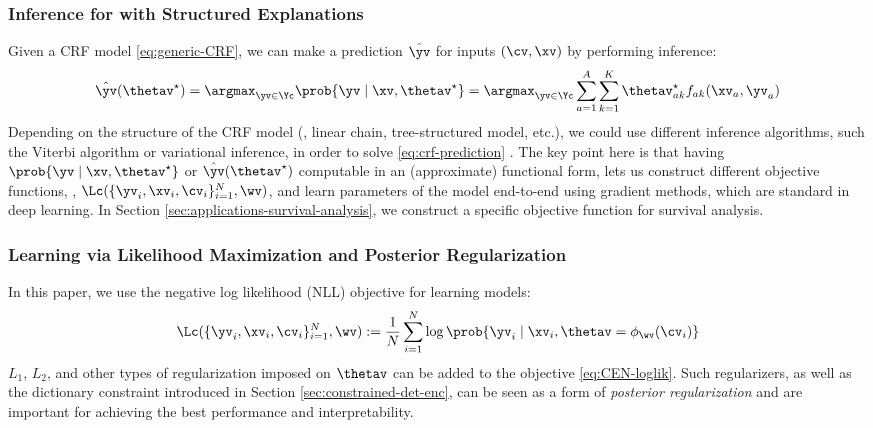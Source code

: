 \documentclass[twoside,11pt]{article}
\begin{document}
\subsubsection{Inference for {\CEN} with Structured Explanations}
\label{sec:inference-CRF}

Given a CRF model \eqref{eq:generic-CRF}, we can make a prediction $\hat\yv$ for inputs $(\cv, \xv)$ by performing inference:
\begin{equation}
    \label{eq:crf-prediction}
    \hat\yv (\thetav^\star) = \argmax_{\yv \in \Yc} \prob{\yv \mid \xv, \thetav^\star} = \argmax_{\yv \in \Yc} \sum_{a=1}^A \sum_{k=1}^K \thetav^\star_{ak} f_{ak}(\xv_a, \yv_a)
\end{equation}
Depending on the structure of the CRF model (\eg, linear chain, tree-structured model, etc.), we could use different inference algorithms, such the Viterbi algorithm or variational inference, in order to solve \eqref{eq:crf-prediction} \citep[see Ch. 4,][for an overview and examples]{sutton2012crftutorial}.
The key point here is that having $\prob{\yv \mid \xv, \thetav^\star}$ or $\hat\yv(\thetav^\star)$ computable in an (approximate) functional form, lets us construct different objective functions, \eg, $\Lc(\{\yv_i, \xv_i, \cv_i\}_{i=1}^N, \wv)$, and learn parameters of the {\CEN} model end-to-end using gradient methods, which are standard in deep learning.
In Section \ref{sec:applications-survival-analysis}, we construct a specific objective function for survival analysis.

\subsubsection{Learning via Likelihood Maximization and Posterior Regularization}
\label{sec:learning-mle-posterior-reg}

In this paper, we use the negative log likelihood (NLL) objective for learning {\CEN} models:
\begin{equation}
    \label{eq:CEN-loglik}
    \Lc(\{\yv_i, \xv_i, \cv_i\}_{i=1}^N, \wv) := \frac{1}{N} \sum_{i=1}^N \log \prob{\yv_i \mid \xv_i, \thetav = \phi_{\wv}(\cv_i)}
\end{equation}
$L_1$, $L_2$, and other types of regularization imposed on $\thetav$ can be added to the objective \eqref{eq:CEN-loglik}.
Such regularizers, as well as the dictionary constraint introduced in Section \ref{sec:constrained-det-enc}, can be seen as a form of \emph{posterior regularization} \citep{ganchev2010posterior} and are important for achieving the best performance and interpretability.
 
\end{document}

